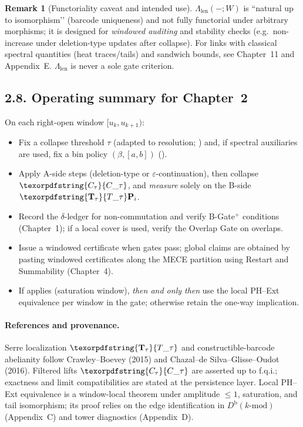 \documentclass[11pt]{article}
\numberwithin{equation}{section}
\theoremstyle{plain}
\theoremstyle{definition}
\theoremstyle{remark}
\theoremstyle{plain}
\theoremstyle{definition}
\numberwithin{equation}{section}
\theoremstyle{definition}
\newtheorem{remark}[theorem]{Remark}
\DeclareRobustCommand{\Ttau}{\texorpdfstring{\ensuremath{\mathbf{T}_{\tau}}}{T\_\tau}}
\DeclareRobustCommand{\Ctau}{\texorpdfstring{\ensuremath{C_{\tau}}}{C\_\tau}}
\numberwithin{equation}{section}
\theoremstyle{plain}
\theoremstyle{definition}
\theoremstyle{remark}
\newcommand{\Dbk}{D^{\mathrm{b}}(k\text{-mod})}
\newcommand{\Len}{\Lambda_{\mathrm{len}}}
\providecommand{\Cfun}[1]{\mathsf{C}_{#1}}
\providecommand{\Tfun}[1]{\mathbf{T}_{#1}}
\providecommand{\Ctau}{\Cfun{\tau}}
\providecommand{\Ttau}{\Tfun{\tau}}
\begin{document}
\begin{remark}[Functoriality caveat and intended use]
\(\Len(-;W)\) is “natural up to isomorphism’’ (barcode uniqueness) and not fully functorial under arbitrary morphisms; it is designed for \emph{windowed auditing} and stability checks (e.g.\ non-increase under deletion-type updates after collapse). For links with classical spectral quantities (heat traces/tails) and sandwich bounds, see Chapter~11 and Appendix~E. \(\Len\) is never a sole gate criterion.
\end{remark}

\subsection*{2.8. Operating summary for Chapter~2}
On each right-open window \([u_k,u_{k+1})\):
\begin{itemize}[leftmargin=1.25em]
  \item Fix a collapse threshold \(\tau\) (adapted to resolution; ) and, if spectral auxiliaries are used, fix a bin policy \((\beta,[a,b])\) ().
  \item Apply A-side steps (deletion-type or \(\varepsilon\)-continuation), then collapse \(\Ctau\), and \emph{measure} solely on the B-side \(\Ttau\mathbf{P}_i\).
  \item Record the \(\delta\)-ledger for non-commutation and verify B-Gate\(^{+}\) conditions (Chapter~1); if a local cover is used, verify the Overlap Gate on overlaps.
  \item Issue a windowed certificate when gates pass; global claims are obtained by pasting windowed certificates along the MECE partition using Restart and Summability (Chapter~4).
  \item If  applies (saturation window), \emph{then and only then} use the local PH–Ext equivalence per window in the gate; otherwise retain the one-way implication.
\end{itemize}

\paragraph{References and provenance.}
Serre localization \(\Ttau\) and constructible-barcode abelianity follow Crawley--Boevey (2015) and Chazal--de Silva--Glisse--Oudot (2016). Filtered lifts \(\Ctau\) are asserted up to f.q.i.; exactness and limit compatibilities are stated at the persistence layer. Local PH–Ext equivalence is a window-local theorem under amplitude \(\le 1\), saturation, and tail isomorphism; its proof relies on the edge identification in \(\Dbk\) (Appendix~C) and tower diagnostics (Appendix~D).
\end{document}
